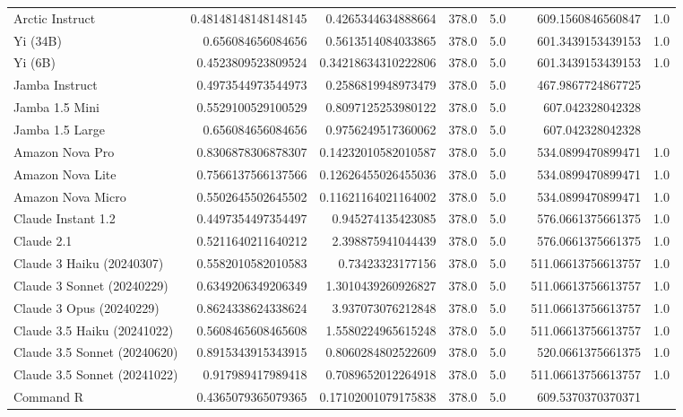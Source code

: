 \begin{table}[htp]
{\begin{tabular}{lrrrrrrr}
Arctic Instruct & 0.48148148148148145 & 0.4265344634888664 & 378.0 & 5.0 &  & 609.1560846560847 & 1.0 \\
Yi (34B) & 0.656084656084656 & 0.5613514084033865 & 378.0 & 5.0 &  & 601.3439153439153 & 1.0 \\
Yi (6B) & 0.4523809523809524 & 0.34218634310222806 & 378.0 & 5.0 &  & 601.3439153439153 & 1.0 \\
Jamba Instruct & 0.4973544973544973 & 0.2586819948973479 & 378.0 & 5.0 &  & 467.9867724867725 &  \\
Jamba 1.5 Mini & 0.5529100529100529 & 0.8097125253980122 & 378.0 & 5.0 &  & 607.042328042328 &  \\
Jamba 1.5 Large & 0.656084656084656 & 0.9756249517360062 & 378.0 & 5.0 &  & 607.042328042328 &  \\
Amazon Nova Pro & 0.8306878306878307 & 0.14232010582010587 & 378.0 & 5.0 &  & 534.0899470899471 & 1.0 \\
Amazon Nova Lite & 0.7566137566137566 & 0.12626455026455036 & 378.0 & 5.0 &  & 534.0899470899471 & 1.0 \\
Amazon Nova Micro & 0.5502645502645502 & 0.11621164021164002 & 378.0 & 5.0 &  & 534.0899470899471 & 1.0 \\
Claude Instant 1.2 & 0.4497354497354497 & 0.945274135423085 & 378.0 & 5.0 &  & 576.0661375661375 & 1.0 \\
Claude 2.1 & 0.5211640211640212 & 2.398875941044439 & 378.0 & 5.0 &  & 576.0661375661375 & 1.0 \\
Claude 3 Haiku (20240307) & 0.5582010582010583 & 0.73423323177156 & 378.0 & 5.0 &  & 511.06613756613757 & 1.0 \\
Claude 3 Sonnet (20240229) & 0.6349206349206349 & 1.3010439260926827 & 378.0 & 5.0 &  & 511.06613756613757 & 1.0 \\
Claude 3 Opus (20240229) & 0.8624338624338624 & 3.937073076212848 & 378.0 & 5.0 &  & 511.06613756613757 & 1.0 \\
Claude 3.5 Haiku (20241022) & 0.5608465608465608 & 1.5580224965615248 & 378.0 & 5.0 &  & 511.06613756613757 & 1.0 \\
Claude 3.5 Sonnet (20240620) & 0.8915343915343915 & 0.8060284802522609 & 378.0 & 5.0 &  & 520.0661375661375 & 1.0 \\
Claude 3.5 Sonnet (20241022) & 0.917989417989418 & 0.7089652012264918 & 378.0 & 5.0 &  & 511.06613756613757 & 1.0 \\
Command R & 0.4365079365079365 & 0.17102001079175838 & 378.0 & 5.0 &  & 609.5370370370371 &  \\

\end{tabular}}
\end{table}
